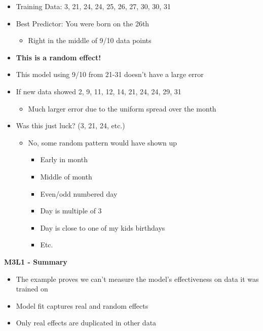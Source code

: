 \documentclass[
]{book}
\providecommand{\tightlist}{%
  \setlength{\itemsep}{0pt}\setlength{\parskip}{0pt}}
\begin{document}
\begin{itemize}
\tightlist
\item
  Training Data: 3, 21, 24, 24, 25, 26, 27, 30, 30, 31
\item
  Best Predictor: You were born on the 26th

  \begin{itemize}
  \tightlist
  \item
    Right in the middle of 9/10 data points
  \end{itemize}
\item
  \textbf{This is a random effect!}
\item
  This model using 9/10 from 21-31 doesn't have a large error
\item
  If new data showed 2, 9, 11, 12, 14, 21, 24, 24, 29, 31

  \begin{itemize}
  \tightlist
  \item
    Much larger error due to the uniform spread over the month
  \end{itemize}
\item
  Was this just luck? (3, 21, 24, etc.)

  \begin{itemize}
  \tightlist
  \item
    No, some random pattern would have shown up

    \begin{itemize}
    \tightlist
    \item
      Early in month
    \item
      Middle of month
    \item
      Even/odd numbered day
    \item
      Day is multiple of 3
    \item
      Day is close to one of my kids birthdays
    \item
      Etc.
    \end{itemize}
  \end{itemize}
\end{itemize}

\textbf{M3L1 - Summary}

\begin{itemize}
\tightlist
\item
  The example proves we can't measure the model's effectiveness on data it was trained on
\item
  Model fit captures real and random effects
\item
  Only real effects are duplicated in other data
\end{itemize}
\end{document}
